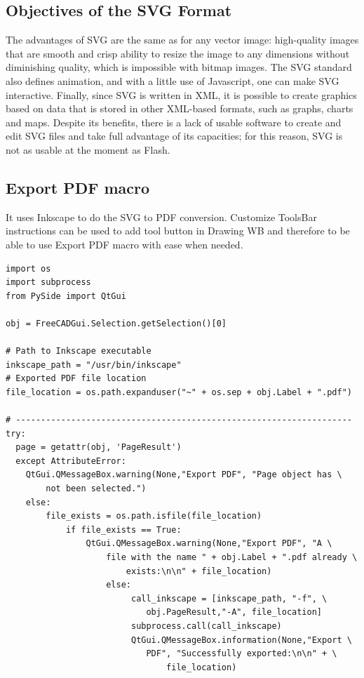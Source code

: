 \subsection{Objectives of the SVG Format}
The advantages of SVG are the same as for any vector image: high-quality images that are smooth and crisp
ability to resize the image to any dimensions without diminishing quality, which is impossible with bitmap
images. The SVG standard also defines animation, and with a little use of Javascript, one can make SVG
interactive. Finally, since SVG is written in XML, it is possible to create graphics based on data that is stored
in other XML-based formats, such as graphs, charts and maps. Despite its benefits, there is a lack of usable
software to create and edit SVG files and take full advantage of its capacities; for this reason, SVG is not as
usable at the moment as Flash.

\subsection{Export PDF macro}
It uses Inkscape to do the SVG to PDF conversion. Customize ToolsBar 
instructions can be used to add tool button in Drawing WB and therefore 
to be able to use Export PDF macro with ease when needed.
\begin{verbatim}  
import os
import subprocess
from PySide import QtGui

obj = FreeCADGui.Selection.getSelection()[0]

# Path to Inkscape executable
inkscape_path = "/usr/bin/inkscape"
# Exported PDF file location
file_location = os.path.expanduser("~" + os.sep + obj.Label + ".pdf")

# -------------------------------------------------------------------
try:
  page = getattr(obj, 'PageResult')
  except AttributeError:
    QtGui.QMessageBox.warning(None,"Export PDF", "Page object has \
        not been selected.")
    else:
        file_exists = os.path.isfile(file_location)
            if file_exists == True:
                QtGui.QMessageBox.warning(None,"Export PDF", "A \
                    file with the name " + obj.Label + ".pdf already \
                        exists:\n\n" + file_location)
                    else:
                         call_inkscape = [inkscape_path, "-f", \
                            obj.PageResult,"-A", file_location]
                         subprocess.call(call_inkscape)
                         QtGui.QMessageBox.information(None,"Export \
                            PDF", "Successfully exported:\n\n" + \
                                file_location)
\end{verbatim}  

